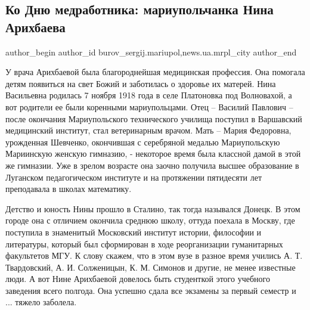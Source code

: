  
 
 
 
 
 
\subsection{Ко Дню медработника: мариупольчанка Нина Арихбаева}
\label{sec:15_06_2019.stz.news.ua.mrpl_city.1.ko_dnju_medrabotnika_mariupolchanka_nina_arihbajeva}
 
\ifcmt
 author_begin
   author_id burov_sergij.mariupol,news.ua.mrpl_city
 author_end
\fi


У врача Арихбаевой была благороднейшая медицинская профессия. Она помогала
детям появиться на свет Божий и заботилась о здоровье их матерей. Нина
Васильевна родилась 7 ноября 1918 года в селе Платоновка под Волновахой, а вот
родители ее были коренными мариупольцами. Отец – Василий Павлович – после
окончания Мариупольского технического училища поступил в Варшавский медицинский
институт, стал ветеринарным врачом. Мать – Мария Федоровна, урожденная
Шевченко, окончившая с серебряной медалью Мариупольскую Мариинскую женскую
гимназию, - некоторое время была классной дамой в этой же гимназии. Уже в
зрелом возрасте она заочно получила высшее образование в Луганском
педагогическом институте и на протяжении пятидесяти лет преподавала в школах
математику.

Детство и юность Нины прошло в Сталино, так тогда назывался Донецк. В этом
городе она с отличием окончила среднюю школу, оттуда поехала в Москву, где
поступила в знаменитый Московский институт истории, философии и литературы,
который был сформирован в ходе реорганизации гуманитарных факультетов МГУ. К
слову скажем, что в этом вузе в разное время учились А. Т. Твардовский, А. И.
Солженицын, К. М. Симонов и другие, не менее известные люди. А вот Нине
Арихбаевой довелось быть студенткой этого учебного заведения всего полгода. Она
успешно сдала все экзамены за первый семестр и ... тяжело заболела.

